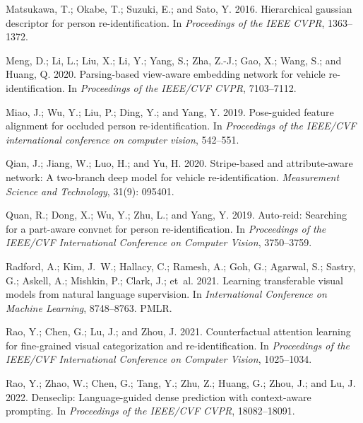 \documentclass[letterpaper]{article} \usepackage{aaai23}  \usepackage{times}  \usepackage{helvet}  \usepackage{courier}  \usepackage[hyphens]{url}  \usepackage{graphicx} \urlstyle{rm} \def\UrlFont{\rm}  \usepackage{natbib}  \usepackage{caption} \frenchspacing  \setlength{\pdfpagewidth}{8.5in}  \setlength{\pdfpageheight}{11in}  \usepackage{algorithm}
\begin{document}
\begin{small}
\begin{thebibliography}{65}
Matsukawa, T.; Okabe, T.; Suzuki, E.; and Sato, Y. 2016.
\newblock Hierarchical gaussian descriptor for person re-identification.
\newblock In \emph{Proceedings of the IEEE CVPR}, 1363--1372.

Meng, D.; Li, L.; Liu, X.; Li, Y.; Yang, S.; Zha, Z.-J.; Gao, X.; Wang, S.; and
  Huang, Q. 2020.
\newblock Parsing-based view-aware embedding network for vehicle
  re-identification.
\newblock In \emph{Proceedings of the IEEE/CVF CVPR}, 7103--7112.

Miao, J.; Wu, Y.; Liu, P.; Ding, Y.; and Yang, Y. 2019.
\newblock Pose-guided feature alignment for occluded person re-identification.
\newblock In \emph{Proceedings of the IEEE/CVF international conference on
  computer vision}, 542--551.

Qian, J.; Jiang, W.; Luo, H.; and Yu, H. 2020.
\newblock Stripe-based and attribute-aware network: A two-branch deep model for
  vehicle re-identification.
\newblock \emph{Measurement Science and Technology}, 31(9): 095401.

Quan, R.; Dong, X.; Wu, Y.; Zhu, L.; and Yang, Y. 2019.
\newblock Auto-reid: Searching for a part-aware convnet for person
  re-identification.
\newblock In \emph{Proceedings of the IEEE/CVF International Conference on
  Computer Vision}, 3750--3759.

Radford, A.; Kim, J.~W.; Hallacy, C.; Ramesh, A.; Goh, G.; Agarwal, S.; Sastry,
  G.; Askell, A.; Mishkin, P.; Clark, J.; et~al. 2021.
\newblock Learning transferable visual models from natural language
  supervision.
\newblock In \emph{International Conference on Machine Learning}, 8748--8763.
  PMLR.

Rao, Y.; Chen, G.; Lu, J.; and Zhou, J. 2021.
\newblock Counterfactual attention learning for fine-grained visual
  categorization and re-identification.
\newblock In \emph{Proceedings of the IEEE/CVF International Conference on
  Computer Vision}, 1025--1034.

Rao, Y.; Zhao, W.; Chen, G.; Tang, Y.; Zhu, Z.; Huang, G.; Zhou, J.; and Lu, J.
  2022.
\newblock Denseclip: Language-guided dense prediction with context-aware
  prompting.
\newblock In \emph{Proceedings of the IEEE/CVF CVPR}, 18082--18091.


\end{thebibliography}
\end{small}
\end{document}
